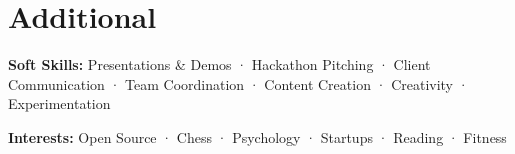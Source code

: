 \section*{Additional}

\textbf{Soft Skills:} Presentations \& Demos · Hackathon Pitching · Client Communication · Team Coordination · Content Creation · Creativity · Experimentation

\vspace{2pt}

\textbf{Interests:} Open Source · Chess · Psychology · Startups · Reading · Fitness